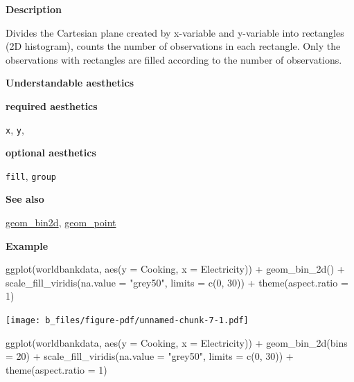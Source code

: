 \documentclass[
  letterpaper,
  DIV=11,
  numbers=noendperiod]{scrreprt}
\newenvironment{Shaded}{\begin{snugshade}}{\end{snugshade}}
\newcommand{\AttributeTok}[1]{\textcolor[rgb]{0.40,0.45,0.13}{#1}}
\newcommand{\DecValTok}[1]{\textcolor[rgb]{0.68,0.00,0.00}{#1}}
\newcommand{\FunctionTok}[1]{\textcolor[rgb]{0.28,0.35,0.67}{#1}}
\newcommand{\NormalTok}[1]{\textcolor[rgb]{0.00,0.23,0.31}{#1}}
\newcommand{\SpecialCharTok}[1]{\textcolor[rgb]{0.37,0.37,0.37}{#1}}
\newcommand{\StringTok}[1]{\textcolor[rgb]{0.13,0.47,0.30}{#1}}
\begin{document}
\textbf{Description}

Divides the Cartesian plane created by x-variable and y-variable into
rectangles (2D histogram), counts the number of observations in each
rectangle. Only the observations with rectangles are filled according to
the number of observations.

\textbf{Understandable aesthetics}

\textbf{required aesthetics}

\texttt{x}, \texttt{y},

\textbf{optional aesthetics}

\texttt{fill}, \texttt{group}

\textbf{See also}

\hyperref[bin2d]{geom\_bin2d}, \hyperref[point]{geom\_point}

\textbf{Example}

\begin{Shaded}
\begin{Highlighting}[]
\FunctionTok{ggplot}\NormalTok{(worldbankdata, }\FunctionTok{aes}\NormalTok{(}\AttributeTok{y =}\NormalTok{ Cooking, }\AttributeTok{x =}\NormalTok{ Electricity)) }\SpecialCharTok{+}
  \FunctionTok{geom\_bin\_2d}\NormalTok{() }\SpecialCharTok{+}
  \FunctionTok{scale\_fill\_viridis}\NormalTok{(}\AttributeTok{na.value =} \StringTok{"grey50"}\NormalTok{, }\AttributeTok{limits =} \FunctionTok{c}\NormalTok{(}\DecValTok{0}\NormalTok{, }\DecValTok{30}\NormalTok{)) }\SpecialCharTok{+}
  \FunctionTok{theme}\NormalTok{(}\AttributeTok{aspect.ratio =} \DecValTok{1}\NormalTok{)}
\end{Highlighting}
\end{Shaded}

\texttt{[image: b\_files/figure-pdf/unnamed-chunk-7-1.pdf]}

\begin{Shaded}
\begin{Highlighting}[]
\FunctionTok{ggplot}\NormalTok{(worldbankdata, }\FunctionTok{aes}\NormalTok{(}\AttributeTok{y =}\NormalTok{ Cooking, }\AttributeTok{x =}\NormalTok{ Electricity)) }\SpecialCharTok{+}
  \FunctionTok{geom\_bin\_2d}\NormalTok{(}\AttributeTok{bins =} \DecValTok{20}\NormalTok{) }\SpecialCharTok{+}
  \FunctionTok{scale\_fill\_viridis}\NormalTok{(}\AttributeTok{na.value =} \StringTok{"grey50"}\NormalTok{, }\AttributeTok{limits =} \FunctionTok{c}\NormalTok{(}\DecValTok{0}\NormalTok{, }\DecValTok{30}\NormalTok{)) }\SpecialCharTok{+}
  \FunctionTok{theme}\NormalTok{(}\AttributeTok{aspect.ratio =} \DecValTok{1}\NormalTok{)}
\end{Highlighting}
\end{Shaded}
\end{document}

